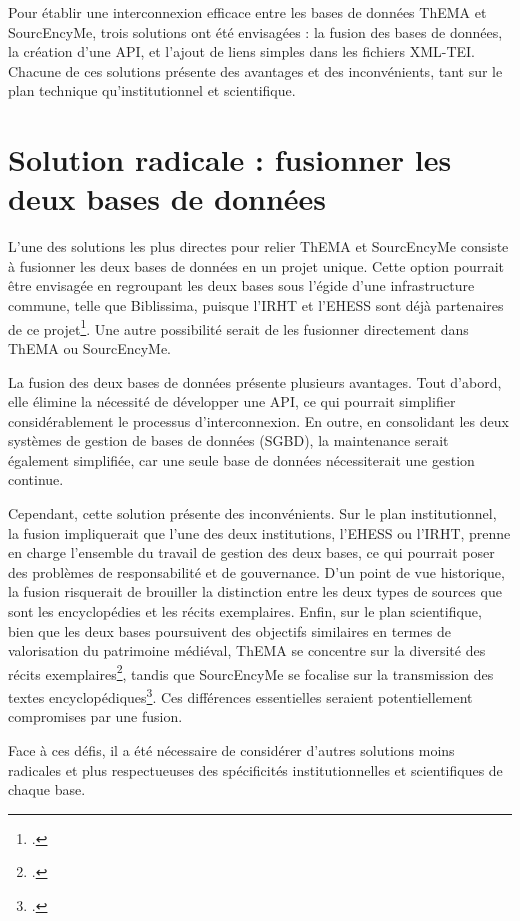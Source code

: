 Pour établir une interconnexion efficace entre les bases de données ThEMA et SourcEncyMe, trois solutions ont été envisagées : la fusion des bases de données, la création d'une API, et l'ajout de liens simples dans les fichiers XML-TEI. Chacune de ces solutions présente des avantages et des inconvénients, tant sur le plan technique qu'institutionnel et scientifique.


\section{Solution radicale : fusionner les deux bases de données}
L'une des solutions les plus directes pour relier ThEMA et SourcEncyMe consiste à fusionner les deux bases de données en un projet unique. Cette option pourrait être envisagée en regroupant les deux bases sous l'égide d'une infrastructure commune, telle que Biblissima, puisque l'IRHT et l'EHESS sont déjà partenaires de ce projet\footcite{PartenairesProjetBiblissima}. Une autre possibilité serait de les fusionner directement dans ThEMA ou SourcEncyMe. 

La fusion des deux bases de données présente plusieurs avantages. Tout d'abord, elle élimine la nécessité de développer une API, ce qui pourrait simplifier considérablement le processus d'interconnexion. En outre, en consolidant les deux systèmes de gestion de bases de données (SGBD), la maintenance serait également simplifiée, car une seule base de données nécessiterait une gestion continue.

Cependant, cette solution présente des inconvénients. Sur le plan institutionnel, la fusion impliquerait que l'une des deux institutions, l'EHESS ou l'IRHT, prenne en charge l'ensemble du travail de gestion des deux bases, ce qui pourrait poser des problèmes de responsabilité et de gouvernance. D'un point de vue historique, la fusion risquerait de brouiller la distinction entre les deux types de sources que sont les encyclopédies et les récits exemplaires. Enfin, sur le plan scientifique, bien que les deux bases poursuivent des objectifs similaires en termes de valorisation du patrimoine médiéval, ThEMA se concentre sur la diversité des récits exemplaires\footcite{ThEMA}, tandis que SourcEncyMe se focalise sur la transmission des textes encyclopédiques\footcite{SourcEncyMe}. Ces différences essentielles seraient potentiellement compromises par une fusion.

Face à ces défis, il a été nécessaire de considérer d'autres solutions moins radicales et plus respectueuses des spécificités institutionnelles et scientifiques de chaque base.


